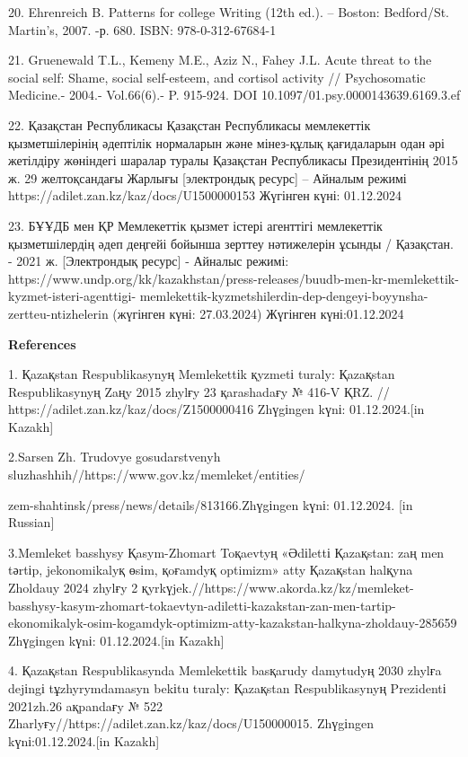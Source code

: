 20. Ehrenreich B. Patterns for college Writing (12th ed.). -- Boston:
Bedford/St. Martin's, 2007. -р. 680. ISBN: 978-0-312-67684-1

21. Gruenewald T.L., Kemeny M.E., Aziz N., Fahey J.L. Acute threat to
the social self: Shame, social self-esteem, and cortisol activity //
Psychosomatic Medicine.- 2004.- Vol.66(6).- P. 915-924. DOI
10.1097/01.psy.0000143639.6169.3.ef

22. Қазақстан Республикасы Қазақстан Республикасы мемлекеттік
қызметшілерінің әдептілік нормаларын және мінез-құлық қағидаларын одан
әрі жетілдіру жөніндегі шаралар туралы Қазақстан Республикасы
Президентінің 2015 ж. 29 желтоқсандағы Жарлығы {[}электрондық ресурс{]}
-- Айналым режимі https://adilet.zan.kz/kaz/docs/U1500000153 Жүгінген
күні: 01.12.2024

23. БҰҰДБ мен ҚР Мемлекеттік қызмет істері агенттігі мемлекеттік
қызметшілердің әдеп деңгейі бойынша зерттеу нәтижелерін ұсынды /
Қазақстан. - 2021 ж. {[}Электрондық ресурс{]} - Айналыс режимі:
https://www.undp.org/kk/kazakhstan/press-releases/buudb-men-kr-memlekettik-kyzmet-isteri-agenttigi-
memlekettik-kyzmetshilerdin-dep-dengeyi-boyynsha-zertteu-ntizhelerin
(жүгінген күні: 27.03.2024) Жүгінген күні:01.12.2024

{\bfseries References}

1. Қazaқstan Respublikasynyң Memlekettіk қyzmetі turaly: Қazaқstan
Respublikasynyң Zaңy 2015 zhylғy 23 қarashadaғy № 416-V ҚRZ. //
https://adilet.zan.kz/kaz/docs/Z1500000416 Zhүgіngen kүnі:
01.12.2024.{[}in Kazakh{]}

2.Sarsen Zh. Trudovye gosudarstvenyh
sluzhashhih//https://www.gov.kz/memleket/entities/

zem-shahtinsk/press/news/details/813166.Zhүgіngen kүnі: 01.12.2024.
{[}in Russian{]}

3.Memleket basshysy Қasym-Zhomart Toқaevtyң «Әdіlettі Қazaқstan: zaң men
tәrtіp, jekonomikalyқ өsіm, қoғamdyқ optimizm» atty Қazaқstan halқyna
Zholdauy 2024 zhylғy 2
қyrkүjek.//https://www.akorda.kz/kz/memleket-basshysy-kasym-zhomart-tokaevtyn-adiletti-kazakstan-zan-men-tartip-ekonomikalyk-osim-kogamdyk-optimizm-atty-kazakstan-halkyna-zholdauy-285659
Zhүgіngen kүnі: 01.12.2024.{[}in Kazakh{]}

4. Қazaқstan Respublikasynda Memlekettіk basқarudy damytudyң 2030 zhylғa
dejіngі tұzhyrymdamasyn bekіtu turaly: Қazaқstan Respublikasynyң
Prezidentі 2021zh.26 aқpandaғy № 522
Zharlyғy//https://adilet.zan.kz/kaz/docs/U150000015. Zhүgіngen
kүnі:01.12.2024.{[}in Kazakh{]}

